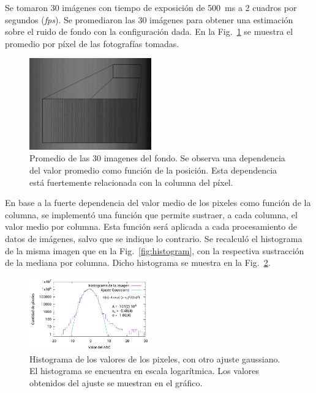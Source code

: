 \documentclass[twoside,twocolumn]{article}
\begin{document}
      Se tomaron 30 imágenes con tiempo de exposición de \SI{500}{\milli\second} a 2 cuadros por segundos (\emph{fps}).
      Se promediaron las 30 imágenes para obtener una estimación sobre el ruido de fondo con la configuración dada. 
      En la Fig.~\ref{fig:background} se muestra el promedio por píxel de las fotografías tomadas.

      \begin{figure}[h]
        \includegraphics[width=0.47\textwidth]{figures/background.jpg}
        \caption{Promedio de las 30 imagenes del fondo. 
          Se observa una dependencia del valor promedio como función de la posición.
          Esta dependencia está fuertemente relacionada con la columna del píxel. }
        \label{fig:background}
      \end{figure}
    
      En base a la fuerte dependencia del valor medio de los pixeles como función de la columna,
      se implementó una función que permite sustraer, a cada columna, el valor medio por columna.
      Esta función será aplicada a cada procesamiento de datos de imágenes, salvo que se indique lo contrario.
      Se recalculó el histograma de la misma imagen que en la Fig.~\ref{fig:histogram}, con la respectiva sustracción
      de la mediana por columna. Dicho histograma se muestra en la Fig.~\ref{fig:histogram_subs}.

      \begin{figure}[h]
        \includegraphics[width=0.47\textwidth]{figures/background_histo_subs.pdf}
        \caption{Histograma de los valores de los pixeles, con otro ajuste gaussiano.
        El histograma se encuentra en escala logarítmica.
        Los valores obtenidos del ajuste se muestran en el gráfico.}
        \label{fig:histogram_subs} %
      \end{figure}
\end{document}
